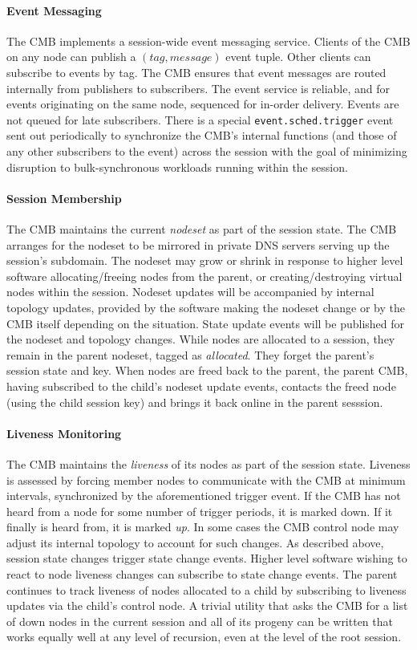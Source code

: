 \paragraph{Event Messaging}
The CMB implements a session-wide event messaging service.
Clients of the CMB on any node can publish a $(tag, message)$ event tuple.
Other clients can subscribe to events by tag.  The CMB ensures that
event messages are routed internally from publishers to subscribers.
The event service is reliable, and for events originating on the same node,
sequenced for in-order delivery.
Events are not queued for late subscribers.
There is a special {\tt event.sched.trigger} event sent out periodically
to synchronize the CMB's internal functions (and those of any other
subscribers to the event) across the session with the goal of minimizing
disruption to bulk-synchronous workloads running within the session.

\paragraph{Session Membership}
The CMB maintains the current {\em nodeset} as part of the session state.
The CMB arranges for the nodeset to be mirrored in private DNS servers
serving up the session's subdomain.
The nodeset may grow or shrink in response to higher level software
allocating/freeing nodes from the parent, or creating/destroying 
virtual nodes within the session.
Nodeset updates will be accompanied by internal topology updates, provided by
the software making the nodeset change or by the CMB itself depending
on the situation.
State update events will be published for the nodeset and topology changes.
While nodes are allocated to a session, they remain in the parent nodeset,
tagged as {\em allocated}.  They forget the parent's session state and key.
When nodes are freed back to the parent, the parent CMB, having subscribed
to the child's nodeset update events, contacts the freed node (using the
child session key) and brings it back online in the parent sesssion.  

\paragraph{Liveness Monitoring}
The CMB maintains the {\em liveness} of its nodes as part
of the session state.
Liveness is assessed by forcing member nodes to communicate with the CMB
at minimum intervals, synchronized by the aforementioned trigger event.
If the CMB has not heard from a node for some number
of trigger periods, it is marked down.
If it finally is heard from, it is marked {\em up}.
In some cases the CMB control node may adjust its internal topology
to account for such changes.
As described above, session state changes trigger state change events.
Higher level software wishing to react to node liveness changes can
subscribe to state change events.
The parent continues to track liveness of nodes allocated to a child by
subscribing to liveness updates via the child's control node.  A trivial
utility that asks the CMB for a list of down nodes in the current session
and all of its progeny can be written that works equally well at any level of recursion,
even at the level of the root session.

